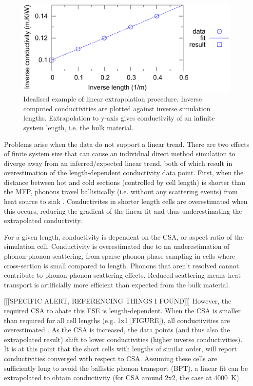 \begin{figure}[h]
  \includegraphics[width=\linewidth]{Figures/ideal_extrap.png}
  \caption{Idealised example of linear extrapolation procedure. Inverse computed conductivities are plotted against inverse simulation lengths. Extrapolation to y-axis gives conductivity of an infinite system length, i.e. the bulk material.}
  \label{fig:ideal}
\end{figure}

Problems arise when the data do not support a linear trend. There are two effects of finite system size that can cause an individual direct method simulation to diverge away from an inferred/expected linear trend, both of which result in overestimation of the length-dependent conductivity data point. First, when the distance between hot and cold sections (controlled by cell length) is shorter than the MFP, phonons travel ballistically (i.e. without any scattering events) from heat source to sink \citep{Sellan2010}. Conductivites in shorter length cells are overestimated when this occurs, reducing the gradient of the linear fit and thus underestimating the extrapolated conductivity.

For a given length, conductivity is dependent on the CSA, or aspect ratio of the simulation cell. Conductivity is overestimated due to an underestimation of phonon-phonon scattering, from sparse phonon phase sampling in cells where cross-section is small compared to length. Phonons that aren't resolved cannot contribute to phonon-phonon scattering effects. Reduced scattering means heat transport is artificially more efficient than expected from the bulk material. 

[[[SPECIFIC ALERT, REFERENCING THINGS I FOUND]]] However, the required CSA to abate this FSE is length-dependent. When the CSA is smaller than required for all cell lengths (e.g. 1x1 [FIGURE]), all conductivities are overestimated \citep[][albeit for nanotube diameter?]{Thomas2010}. As the CSA is increased, the data points (and thus also the extrapolated result) shift to lower conductivities (higher inverse conductivities). It is at this point that the short cells with lengths of similar order, will report conductivities converged with respect to CSA. Assuming these cells are sufficiently long to avoid the ballistic phonon transport (BPT), a linear fit can be extrapolated to obtain conductivity (for CSA around 2x2, the case at 4000~K). 

